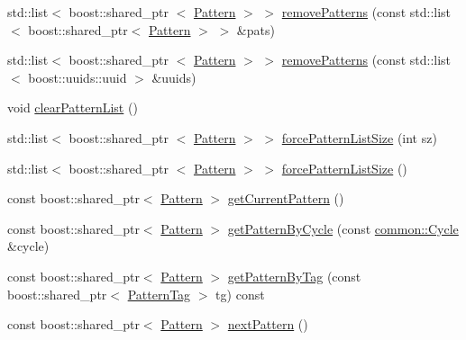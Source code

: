 \begin{DoxyCompactItemize}
\item 
std\-::list$<$ boost\-::shared\-\_\-ptr\*
$<$ \hyperlink{classcryomesh_1_1state_1_1Pattern}{\-Pattern} $>$ $>$ \hyperlink{classcryomesh_1_1state_1_1PatternChannel_a58645e5bd3b44290db489c095ad34895}{remove\-Patterns} (const std\-::list$<$ boost\-::shared\-\_\-ptr$<$ \hyperlink{classcryomesh_1_1state_1_1Pattern}{\-Pattern} $>$ $>$ \&pats)
\item 
std\-::list$<$ boost\-::shared\-\_\-ptr\*
$<$ \hyperlink{classcryomesh_1_1state_1_1Pattern}{\-Pattern} $>$ $>$ \hyperlink{classcryomesh_1_1state_1_1PatternChannel_a95cdc1ef47d4647f16db7a618fbcb1c3}{remove\-Patterns} (const std\-::list$<$ boost\-::uuids\-::uuid $>$ \&uuids)
\item 
void \hyperlink{classcryomesh_1_1state_1_1PatternChannel_a13753c86675493e5cb8cb911238e3410}{clear\-Pattern\-List} ()
\item 
std\-::list$<$ boost\-::shared\-\_\-ptr\*
$<$ \hyperlink{classcryomesh_1_1state_1_1Pattern}{\-Pattern} $>$ $>$ \hyperlink{classcryomesh_1_1state_1_1PatternChannel_a756aafbdf9bd37870b60ae1e5c174c27}{force\-Pattern\-List\-Size} (int sz)
\item 
std\-::list$<$ boost\-::shared\-\_\-ptr\*
$<$ \hyperlink{classcryomesh_1_1state_1_1Pattern}{\-Pattern} $>$ $>$ \hyperlink{classcryomesh_1_1state_1_1PatternChannel_a66783001791bd4b51bec7eb97b8a1b4e}{force\-Pattern\-List\-Size} ()
\item 
const boost\-::shared\-\_\-ptr$<$ \hyperlink{classcryomesh_1_1state_1_1Pattern}{\-Pattern} $>$ \hyperlink{classcryomesh_1_1state_1_1PatternChannel_a92ef0469e782dc022c00d804f30fff3d}{get\-Current\-Pattern} ()
\item 
const boost\-::shared\-\_\-ptr$<$ \hyperlink{classcryomesh_1_1state_1_1Pattern}{\-Pattern} $>$ \hyperlink{classcryomesh_1_1state_1_1PatternChannel_a553a85437f3197ea4fa751319de0fd56}{get\-Pattern\-By\-Cycle} (const \hyperlink{classcryomesh_1_1common_1_1Cycle}{common\-::\-Cycle} \&cycle)
\item 
const boost\-::shared\-\_\-ptr$<$ \hyperlink{classcryomesh_1_1state_1_1Pattern}{\-Pattern} $>$ \hyperlink{classcryomesh_1_1state_1_1PatternChannel_a88e0394f678b199aa5f2866b1487fc92}{get\-Pattern\-By\-Tag} (const boost\-::shared\-\_\-ptr$<$ \hyperlink{classcryomesh_1_1state_1_1PatternTag}{\-Pattern\-Tag} $>$ tg) const 
\item 
const boost\-::shared\-\_\-ptr$<$ \hyperlink{classcryomesh_1_1state_1_1Pattern}{\-Pattern} $>$ \hyperlink{classcryomesh_1_1state_1_1PatternChannel_ae5dd9fdcebe6af92c48c4ac1f0d889c7}{next\-Pattern} ()

\end{DoxyCompactItemize}
